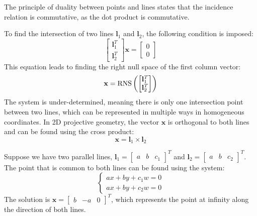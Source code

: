 The principle of duality between points and lines states that the incidence relation is commutative, as the dot product is commutative.

























To find the intersection of two lines $\mathbf{l}_1$ and $\mathbf{l}_2$, the following condition is imposed:
\[\begin{bmatrix} \mathbf{l}_1^T \\ \mathbf{l}_2^T \end{bmatrix} \mathbf{x} = \begin{bmatrix} 0 \\ 0 \end{bmatrix}\]
This equation leads to finding the right null space of the first column vector:
\[\mathbf{x}=\textnormal{RNS}\left(\begin{bmatrix}\mathbf{l}_1^T \\ \mathbf{l}_2^T \end{bmatrix} \right)\]
The system is under-determined, meaning there is only one intersection point between two lines, which can be represented in multiple ways in homogeneous coordinates.
In 2D projective geometry, the vector $\mathbf{x}$ is orthogonal to both lines and can be found using the cross product:
\[\mathbf{x}=\mathbf{l}_1 \times \mathbf{l}_2\]
\begin{example}
    Suppose we have two parallel lines, $\mathbf{l}_1={\begin{bmatrix} a & b & c_1 \end{bmatrix}}^T$ and $\mathbf{l}_2={\begin{bmatrix} a & b & c_2 \end{bmatrix}}^T$. 
    The point that is common to both lines can be found using the system:
    \[\begin{cases}
        ax+by+c_1w=0 \\
        ax+by+c_2w=0
    \end{cases}\]
    The solution is $\mathbf{x}=\begin{bmatrix} b & -a & 0 \end{bmatrix}^T$, which represents the point at infinity along the direction of both lines.
\end{example}

